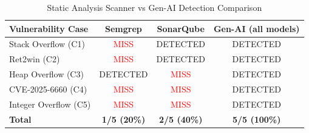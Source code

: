 \begin{table}[htbp]
\centering
\caption{Static Analysis Scanner vs Gen-AI Detection Comparison}
\label{tab:scanner_comparison}
\begin{tabular}{lccc}
\toprule
\textbf{Vulnerability Case} & \textbf{Semgrep} & \textbf{SonarQube} & \textbf{Gen-AI (all models)} \\
\midrule
Stack Overflow (C1) & \textcolor{red}{MISS} & \textcolor{green!60!black}{DETECTED} & \textcolor{green!60!black}{DETECTED} \\
Ret2win (C2) & \textcolor{red}{MISS} & \textcolor{green!60!black}{DETECTED} & \textcolor{green!60!black}{DETECTED} \\
Heap Overflow (C3) & \textcolor{green!60!black}{DETECTED} & \textcolor{red}{MISS} & \textcolor{green!60!black}{DETECTED} \\
CVE-2025-6660 (C4) & \textcolor{red}{MISS} & \textcolor{red}{MISS} & \textcolor{green!60!black}{DETECTED} \\
Integer Overflow (C5) & \textcolor{red}{MISS} & \textcolor{red}{MISS} & \textcolor{green!60!black}{DETECTED} \\
\midrule
\textbf{Total} & \textbf{1/5 (20\%)} & \textbf{2/5 (40\%)} & \textbf{5/5 (100\%)} \\
\bottomrule
\end{tabular}
\end{table}